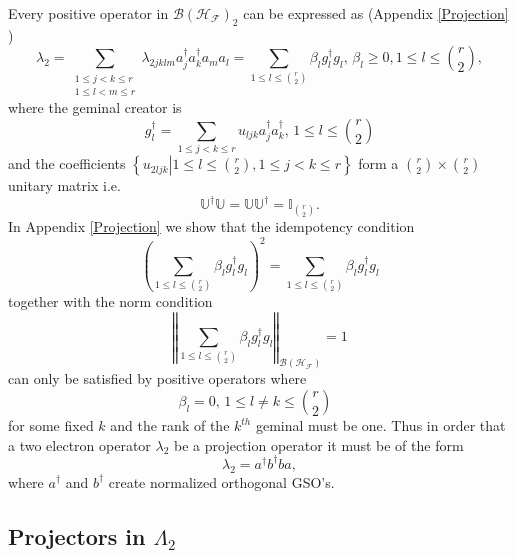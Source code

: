 \documentclass[aps,preprint]{revtex4}%
\begin{document}
Every positive operator in $\mathcal{B}\left(  \mathcal{H}_{\mathcal{F}%
}\right)  _{2}$ can be expressed as (Appendix \ref{Projection} )
\begin{equation}
\lambda_{2}=\sum_{\substack{1\leq j<k\leq r\\1\leq l<m\leq r}}\lambda
_{2jklm}a_{j}^{\dagger}a_{k}^{\dagger}a_{m}a_{l}=\sum_{1\leq l\leq\binom{r}%
{2}}\beta_{l}g_{l}^{\dagger}g_{l},\,\beta_{l}\geq0,1\leq l\leq\binom{r}{2},
\end{equation}
where the geminal creator is
\begin{equation}
g_{l}^{\dagger}=\sum_{1\leq j<k\leq r}u_{ljk}a_{j}^{\dagger}a_{k}^{\dagger
},\,1\leq l\leq\binom{r}{2}%
\end{equation}
and the coefficients $\left\{  \left.  u_{2ljk}\right\vert 1\leq l\leq
\binom{r}{2},1\leq j<k\leq r\right\}  $ form a $\binom{r}{2}\times\binom{r}%
{2}$ unitary matrix i.e.
\begin{equation}
\mathbb{U}^{\dagger}\mathbb{U}=\mathbb{UU}^{\dagger}=\mathbb{I}_{\binom{r}{2}%
}.
\end{equation}
In Appendix \ref{Projection} we show that the idempotency condition
\begin{equation}
\left(  \sum_{1\leq l\leq\binom{r}{2}}\beta_{l}g_{l}^{\dagger}g_{l}\right)
^{2}=\sum_{1\leq l\leq\binom{r}{2}}\beta_{l}g_{l}^{\dagger}g_{l}%
\end{equation}
together with the norm condition
\begin{equation}
\left\Vert \sum_{1\leq l\leq\binom{r}{2}}\beta_{l}g_{l}^{\dagger}%
g_{l}\right\Vert _{\mathcal{B}\left(  \mathcal{H}_{\mathcal{F}}\right)  }=1
\end{equation}
can only be satisfied by positive operators where
\begin{equation}
\beta_{l}=0,\,1\leq l\neq k\leq\binom{r}{2}\text{ }%
\end{equation}
for some fixed $k$ and the rank of the $k^{th}$ geminal must be one. Thus in
order that a two electron operator $\lambda_{2}$ be a projection operator it
must be of the form
\begin{equation}
\lambda_{2}=a^{\dagger}b^{\dagger}ba,
\end{equation}
where $a^{\dagger}$ and $b^{\dagger}$ create normalized orthogonal GSO's.

\subsection{Projectors in $\Lambda_{2}$ \label{Proj1&2}}
\end{document}
